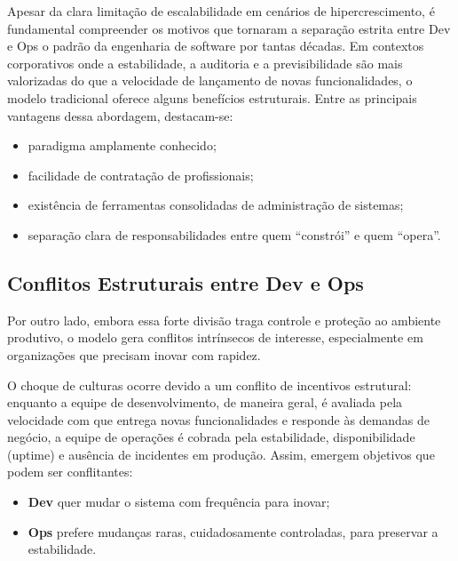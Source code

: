 \documentclass[12pt,a4paper,twoside]{report}
\begin{document}
Apesar da clara limitação de escalabilidade em cenários de hipercrescimento, é fundamental compreender os motivos que tornaram a separação estrita entre Dev e Ops o padrão da engenharia de software por tantas décadas. Em contextos corporativos onde a estabilidade, a auditoria e a previsibilidade são mais valorizadas do que a velocidade de lançamento de novas funcionalidades, o modelo tradicional oferece alguns benefícios estruturais. Entre as principais vantagens dessa abordagem, destacam-se:

\begin{itemize}[nosep]
    \item paradigma amplamente conhecido;
    \item facilidade de contratação de profissionais;
    \item existência de ferramentas consolidadas de administração de sistemas;
    \item separação clara de responsabilidades entre quem ``constrói'' e quem
    ``opera''.
\end{itemize}



\subsection{Conflitos Estruturais entre Dev e Ops}

Por outro lado, embora essa forte divisão traga controle e proteção ao ambiente produtivo, o modelo gera conflitos intrínsecos de interesse, especialmente em organizações que precisam inovar com rapidez.

O choque de culturas ocorre devido a um conflito de incentivos estrutural: enquanto a equipe de desenvolvimento, de maneira geral, é avaliada pela velocidade com que entrega novas funcionalidades e responde às demandas de negócio, a equipe de operações é cobrada pela estabilidade, disponibilidade (uptime) e ausência de incidentes em produção. Assim, emergem objetivos que podem ser conflitantes:

\begin{itemize}[nosep]
    \item \textbf{Dev} quer mudar o sistema com frequência para inovar;
    \item \textbf{Ops} prefere mudanças raras, cuidadosamente controladas, para preservar a estabilidade.
\end{itemize}
\end{document}
